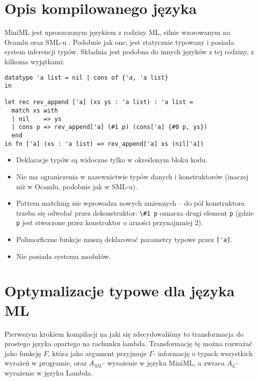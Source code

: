 \documentclass[11pt]{scrartcl}
\begin{document}
\section{Opis kompilowanego języka}
MiniML jest uproszczonym językiem z rodziny ML, silnie wzorowanym na Ocamlu
\cite{Leroy16} oraz SML-u \cite[Chapter 1. What is ML?]{Appel}.
Podobnie jak one, jest statycznie typowany i posiada system inferencji typów.
Składnia jest podobna do innych języków z tej rodziny, z kilkoma wyjątkami:
\begin{lstlisting}
datatype 'a list = nil | cons of {'a, 'a list}
in

let rec rev_append ['a] (xs ys : 'a list) : 'a list =
  match xs with
  | nil    => ys
  | cons p => rev_append['a] (#1 p) (cons['a] {#0 p, ys})
  end
in fn ['a] (xs : 'a list) => rev_append['a] xs (nil['a])
\end{lstlisting}
\begin{itemize}
\item Deklaracje typów są widoczne tylko w określonym bloku kodu.
\item Nie ma ograniczenia w nazewnictwie typów danych i konstruktorów
  (inaczej niż w Ocamlu, podobnie jak w SML-u).
\item Pattern matching nie wprowadza nowych zmiennych -- do pól konstruktora
  trzeba się odwołać przez dekonstruktor: \lstinline|\#1 p| oznacza drugi element \lstinline|p|
  (gdzie \lstinline|p| jest stworzone przez konstruktor o arności przynajmniej 2).
\item Polimorficzne funkcje muszą deklarować parametry typowe przez \lstinline|['a]|.
\item Nie posiada systemu modułów.
\end{itemize}



\section{Optymalizacje typowe dla języka ML}
Pierwszym krokiem kompilacji na jaki się zdecydowaliśmy to transformacja do
prostego języka opartego na rachunku lambda.
Transformację tę można rozważać jako funkcję $F$, która jako argument przyjmuje
$\Gamma$- informację o typach wszystkich wyrażeń w programie, oraz $A_{ML}$-
wyrażenie w języku MiniML, a zwraca $A_L$- wyrażenie w języku Lambda.
\end{document}

